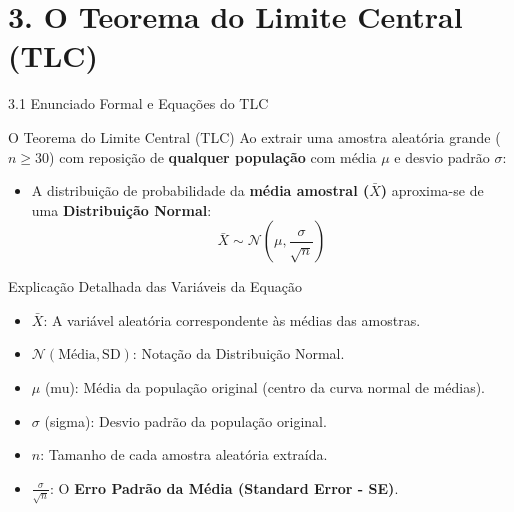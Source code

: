 \documentclass[10pt, aspectratio=169]{beamer}
\begin{document}
\section{3. O Teorema do Limite Central (TLC)}

\begin{frame}{3.1 Enunciado Formal e Equações do TLC}
    \begin{alertblock}{O Teorema do Limite Central (TLC)}
        Ao extrair uma amostra aleatória grande ($n \ge 30$) com reposição de \textbf{qualquer população} com média $\mu$ e desvio padrão $\sigma$:
        \begin{itemize}
            \item A distribuição de probabilidade da \textbf{média amostral ($\bar{X}$)} aproxima-se de uma \textbf{Distribuição Normal}:
                  \[ \bar{X} \sim \mathcal{N}\left(\mu, \frac{\sigma}{\sqrt{n}}\right) \]
        \end{itemize}
    \end{alertblock}

    \vspace{0.2cm}

    \begin{block}{Explicação Detalhada das Variáveis da Equação}
        \begin{itemize}
            \item $\bar{X}$: A variável aleatória correspondente às médias das amostras.
            \item $\mathcal{N}(\text{Média}, \text{SD})$: Notação da Distribuição Normal.
            \item $\mu$ (mu): Média da população original (centro da curva normal de médias).
            \item $\sigma$ (sigma): Desvio padrão da população original.
            \item $n$: Tamanho de cada amostra aleatória extraída.
            \item $\frac{\sigma}{\sqrt{n}}$: O \textbf{Erro Padrão da Média (Standard Error - SE)}.
        \end{itemize}
    \end{block}
\end{frame}
\end{document}
